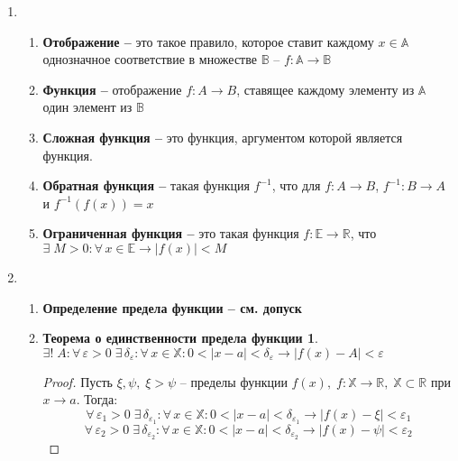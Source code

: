 \documentclass{article}
\theoremstyle{plain}
\begin{document}
\begin{enumerate}
\begin{proof}
        $$\psi \in \delta_{n_k},\,\, x_{n_k} \in \delta_{n_k}\implies |x_{n_k} - \psi| \le b_k - a_k = \frac{b - a}{2^k} \xrightarrow[k \to \infty]{} 0 \implies \lim_{k \to \infty}{x_{n_k}} = \psi$$
        \end{proof}
        \item \begin{enumerate}
            \item \textbf{Отображение --} это такое правило, которое ставит каждому $x \in \mathbb{A}$ однозначное соответствие в множестве $\mathbb{B}$ -- $f: \mathbb{A} \to \mathbb{B}$
            \item \textbf{Функция --} отображение $f: A \to B$, ставящее каждому элементу из $\mathbb{A}$ один элемент из $\mathbb{B}$
            \item \textbf{Сложная функция -- } это функция, аргументом которой является функция.
            \item \textbf{Обратная функция --} такая функция $f^{-1}$, что для $f: A \to B$, $f^{-1}: B \to A$ и $f^{-1}(f(x)) = x$
            \item \textbf{Ограниченная функция -- } это такая функция $f: \mathbb{E}\to \mathbb{R}$, что $\exists\; M > 0: \forall\, x \in \mathbb{E}\rightarrow |f(x)| < M$
        \end{enumerate}
        \item \begin{enumerate}
            \item \textbf{Определение предела функции -- см. допуск}
            \item \newtheorem*{edinstvennost*}{Теорема о единственности предела функции}
            \begin{edinstvennost*}
            $\exists!\; A: \forall\, \varepsilon > 0\; \exists\, \delta_\varepsilon: \forall\, x \in \mathbb{X}:  0 < |x - a| < \delta_\varepsilon \rightarrow |f(x) - A| < \varepsilon$
            \end{edinstvennost*}
            \begin{proof}
                    Пусть $\xi, \psi,\; \xi > \psi$ -- пределы функции $f(x),\; f: \mathbb{X} \to \mathbb{R},\; \mathbb{X} \subset \mathbb{R}$ при $x \to a$. Тогда:
                    $$ \forall\, \varepsilon_1 > 0\; \exists\, \delta_{\varepsilon_1}: \forall\, x \in \mathbb{X}:  0 < |x - a| < \delta_{\varepsilon_1} \rightarrow |f(x) - \xi| < \varepsilon_1$$
                     $$ \forall\, \varepsilon_2 > 0\; \exists\, \delta_{\varepsilon_2}: \forall\, x \in \mathbb{X}:  0 < |x - a| < \delta_{\varepsilon_2} \rightarrow |f(x) - \psi| < \varepsilon_2$$

\end{proof}
\end{enumerate}
\end{enumerate}
\end{document}
